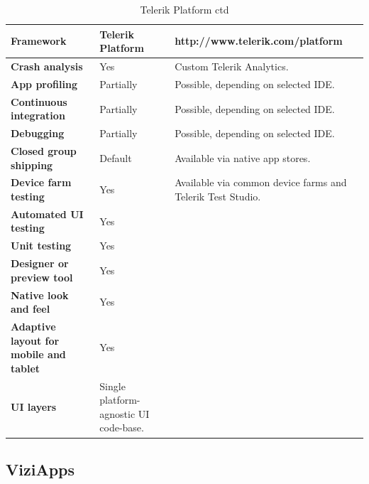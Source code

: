 \documentclass[english,master,public,dept460,male,cpdeclaration,oneside]{diploma}
\begin{document}
\begin{table}[!h]
	\centering
	\caption{Telerik Platform ctd}
	\begin{tabular}{p{} | p{} | p{}}
		\toprule		
		\textbf{Framework} & \textbf{Telerik Platform} & http://www.telerik.com/platform \\
		\midrule
		\textbf{Crash analysis} & Yes & Custom Telerik Analytics. \\			
		\midrule
		\textbf{App profiling} & Partially & Possible, depending on selected IDE. \\			
		\midrule
		\textbf{Continuous integration} & Partially & Possible, depending on selected IDE. \\			
		\midrule
		\textbf{Debugging} & Partially & Possible, depending on selected IDE. \\			
		\midrule
		\textbf{Closed group shipping} & Default & Available via native app stores. \\			
		\midrule
		\textbf{Device farm testing} & Yes & Available via common device farms and Telerik Test Studio. \\			
		\midrule
		\textbf{Automated UI testing} & Yes & \\			
		\midrule
		\textbf{Unit testing} & Yes & \\			
		\midrule
		\textbf{Designer or preview tool} & Yes & \\			
		\midrule
		\textbf{Native look and feel} & Yes & \\			
		\midrule
		\textbf{Adaptive layout for mobile and tablet} & Yes & \\			
		\midrule		
		\textbf{UI layers} & Single platform-agnostic UI code-base. & \\			
		\midrule
	\end{tabular}
\end{table}

\clearpage
\subsection{ViziApps}
\end{document}
